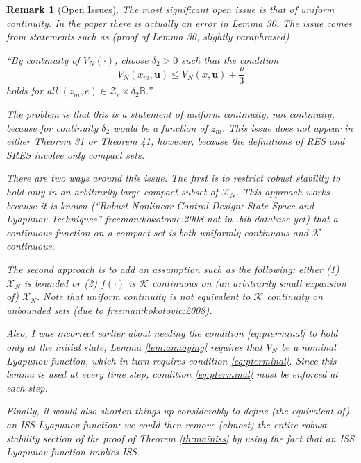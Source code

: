 \documentclass{article}
\newtheorem{remark}{Remark}
\newcommand{\abs}[1]{\left\lvert #1 \right\rvert}
\begin{document}
\begin{remark}[Open Issues]
\label{rm:issues}
The most significant open issue is that of uniform continuity. In the paper \cite{pannocchia:rawlings:wright:2011} there is actually an error in Lemma 30.
The issue comes from statements such as (proof of Lemma 30, slightly paraphrased)

``By continuity of $V_N(\cdot)$, choose $\delta_2 > 0$ such that the condition
\begin{equation*}
V_N(x_m,\mathbf{u}) \leq V_N(x,\mathbf{u}) + \frac{\rho}{3}
\end{equation*}
holds for all $(z_m,e) \in \mathcal{Z}_r \times \delta_2\mathbb{B}$.''

The problem is that this is a statement of uniform continuity, not continuity, because for continuity
$\delta_2$ would be a function of $z_m$. This issue does not appear in either Theorem 31 or Theorem 41,
however, because the definitions of RES and SRES involve only compact sets.

There are two ways around this issue. The first is to restrict robust stability to hold only in an 
arbitrarily large compact subset of $\mathcal{X}_N$. This approach works because it is known 
(``Robust Nonlinear Control Design: State-Space and Lyapunov Techniques'' freeman:kokotovic:2008 
not in .bib database yet) that a continuous function on a compact set is both uniformly continuous 
and $\mathcal{K}$ continuous. 

The second approach is to add an assumption such as the following: either (1) $\mathcal{X}_N$ is 
bounded or (2) $f(\cdot)$ is $\mathcal{K}$ continuous on (an arbitrarily small expansion of) $\mathcal{X}_N$. Note that uniform continuity is
not equivalent to $\mathcal{K}$ continuity on unbounded sets (due to freeman:kokotovic:2008).


Also, I was incorrect earlier about needing the condition \ref{eq:pterminal} to hold only 
at the initial state;
Lemma \ref{lem:annoying} requires that $V_N$ be a nominal Lyapunov function, which in turn requires 
condition \eqref{eq:pterminal}. Since this lemma is used at every time step, condition \ref{eq:pterminal}
must be enforced at each step.

Finally, it would also shorten things up considerably to define (the equivalent of) an ISS Lyapunov function; 
we could then remove (almost) the entire robust stability section of the proof of 
Theorem \ref{th:mainiss} by using the fact that an ISS Lyapunov function implies ISS.

\end{remark}
\end{document}

